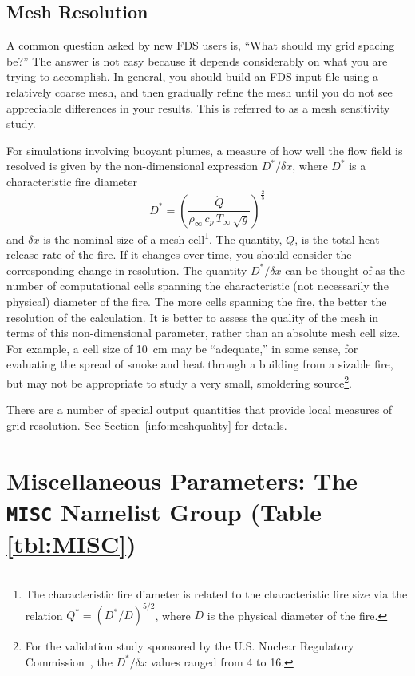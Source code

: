 \documentclass[11pt]{book}
\newcommand{\dx}{\delta x}
\newcommand{\dQ}{\dot{Q}}
\newcommand{\be}{\begin{equation}}
\newcommand{\ee}{\end{equation}}
\begin{document}
\subsection{Mesh Resolution}

A common question asked by new FDS users is, ``What should my grid spacing be?''
The answer is not easy because it depends considerably on what you are trying
to accomplish. In general, you should build an FDS input file using a relatively
coarse mesh, and then gradually refine the mesh until you do not see
appreciable differences in your results. This is referred to as a mesh sensitivity study.

For simulations involving buoyant plumes, a measure of how well the flow field is resolved is given by the
non-dimensional expression $D^*/\dx$, where $D^*$ is a characteristic
fire diameter
\be D^* = \left(
     \frac{\dQ}{\rho_\infty \, c_p \, T_\infty \, \sqrt{g} }
     \right)^\frac{2}{5}  \ee
and $\dx$ is the nominal size of a mesh cell\footnote{The characteristic
fire diameter is related to the characteristic fire size via the
relation $Q^* = (D^*/D)^{5/2}$, where $D$ is the physical diameter of the
fire.}. The quantity, $\dQ$, is the total heat release rate of the fire. If it changes over time, you should consider the
corresponding change in resolution. The quantity $D^*/\dx$ can be thought of as the number of computational cells
spanning the characteristic (not necessarily the physical) diameter of the fire.
The more cells spanning the fire, the better the resolution of the
calculation. It is better to assess the quality of the mesh in terms
of this non-dimensional parameter, rather than an absolute mesh cell size.
For example, a cell size of 10~cm may be ``adequate,'' in some sense,
for evaluating the spread of smoke and heat through a building from a
sizable fire, but may not be appropriate to study a very small, smoldering source\footnote{For the validation study sponsored by the
U.S. Nuclear Regulatory Commission~\cite{NUREG_1824}, the $D^*/\dx$ values ranged from 4 to 16.}.

\begin{warning}
\noindent
There are a number of special output quantities that provide local measures of grid resolution. See Section~\ref{info:meshquality} for details.
\end{warning}



\clearpage
\section{Miscellaneous Parameters: The \texorpdfstring{{\tt MISC}}{MISC} Namelist Group (Table \ref{tbl:MISC})}
\label{info:MISC}
\end{document}
